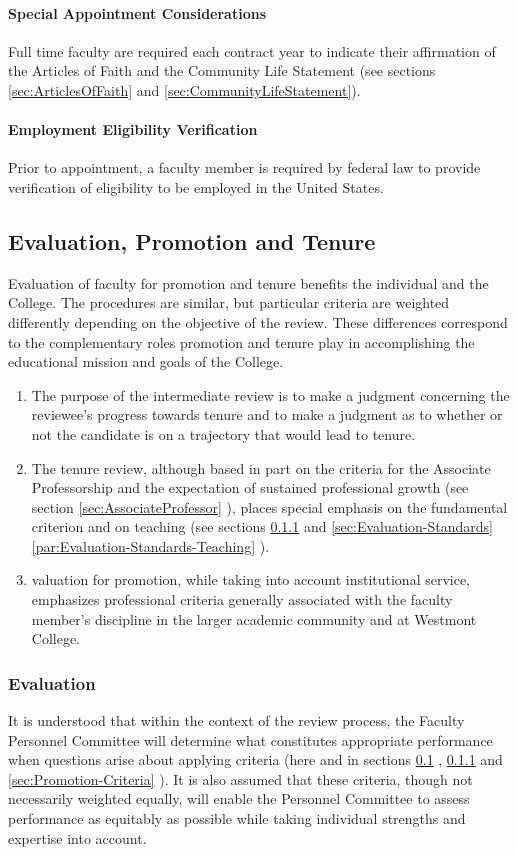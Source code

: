 			\paragraph{Special Appointment Considerations}
				Full time faculty are required each contract year to indicate their affirmation of the Articles of Faith and the Community Life Statement (see
				sections
				\ref{sec:ArticlesOfFaith}
				and
				\ref{sec:CommunityLifeStatement}).
			\paragraph{Employment Eligibility Verification}
				Prior to appointment, a faculty member is required by federal law to provide verification of eligibility to be employed in the United States.
	\subsection{Evaluation, Promotion and Tenure}
		\label{sec:EvaluationPromotionAndTenure}
		Evaluation of faculty for promotion and tenure benefits the individual and the College. The procedures are similar, but particular criteria are weighted differently depending on the objective of the review.  These differences correspond to the complementary roles promotion and tenure play in accomplishing the educational mission and goals of the College.
		\begin{enumerate}
			\item{The purpose of the intermediate review is to make a judgment
				concerning the reviewee's progress towards tenure and to make a judgment
				as to whether or not the candidate is on a trajectory that would lead to
				tenure.}
			\item{The tenure review, although based in part on the criteria for the
				Associate Professorship and the expectation of sustained professional
				growth (see section
				\ref{sec:AssociateProfessor}
				), places special emphasis on the
				fundamental criterion and on teaching (see
				sections
				\ref{sec:Evaluation}
				and
				\ref{sec:Evaluation-Standards}
				\ref{par:Evaluation-Standards-Teaching}
				).
			}
			\item{ valuation for promotion, while taking into account institutional
				service, emphasizes professional criteria generally associated with the
				faculty member's discipline in the larger academic community and at
				Westmont College.}
		\end{enumerate}
		\subsubsection{Evaluation}
			\label{sec:Evaluation}
			It is understood that within the context of the review process, the Faculty Personnel Committee will determine what constitutes appropriate performance when questions arise about applying criteria (here and in sections
			\ref{sec:EvaluationPromotionAndTenure}
			,
			\ref{sec:Evaluation}
			and
			\ref{sec:Promotion-Criteria}
			).  It is also assumed that these criteria, though not necessarily weighted equally, will enable the Personnel Committee to assess performance as equitably as possible while taking individual strengths and expertise into account.
